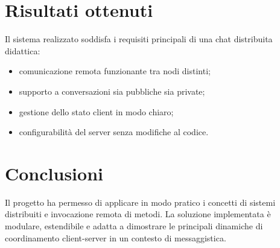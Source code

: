 \documentclass[11pt,a4paper]{article}
\begin{document}
\section{Risultati ottenuti}
Il sistema realizzato soddisfa i requisiti principali di una chat distribuita didattica:
\begin{itemize}
  \item comunicazione remota funzionante tra nodi distinti;
  \item supporto a conversazioni sia pubbliche sia private;
  \item gestione dello stato client in modo chiaro;
  \item configurabilità del server senza modifiche al codice.
\end{itemize}

\section{Conclusioni}
Il progetto ha permesso di applicare in modo pratico i concetti di sistemi distribuiti e invocazione remota di metodi. La soluzione implementata è modulare, estendibile e adatta a dimostrare le principali dinamiche di coordinamento client-server in un contesto di messaggistica.
\end{document}
